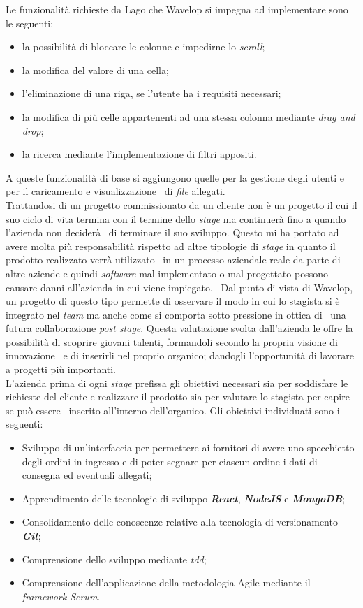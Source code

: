 Le funzionalità richieste da Lago che Wavelop si impegna ad implementare sono le seguenti: \
\begin{itemize}
  \item la possibilità di bloccare le colonne e impedirne lo \emph{scroll};
  \item la modifica del valore di una cella;
  \item l'eliminazione di una riga, se l'utente ha i requisiti necessari;
  \item la modifica di più celle appartenenti ad una stessa colonna mediante \emph{drag and drop};
  \item la ricerca mediante l'implementazione di filtri appositi.
\end{itemize}
A queste funzionalità di base si aggiungono quelle per la gestione degli utenti e per il caricamento e visualizzazione \
di \emph{file} allegati. \\

Trattandosi di un progetto commissionato da un cliente non è un progetto il cui il suo ciclo di vita termina con il termine dello \emph{stage} ma continuerà fino a quando l'azienda non deciderà \
di terminare il suo sviluppo. Questo mi ha portato ad avere molta più responsabilità rispetto ad altre tipologie di \emph{stage} in quanto il prodotto realizzato verrà utilizzato \
in un processo aziendale reale da parte di altre aziende e quindi \emph{software} mal implementato o mal progettato possono causare danni all'azienda in cui viene impiegato. \
Dal punto di vista di Wavelop, un progetto di questo tipo permette di osservare il modo in cui lo stagista si è integrato nel \emph{team} ma anche come si comporta sotto pressione in ottica di \
una futura collaborazione \emph{post stage}. Questa valutazione svolta dall'azienda le offre la possibilità di scoprire giovani talenti, formandoli secondo la propria visione di innovazione \
e di inserirli nel proprio organico; dandogli l'opportunità di lavorare a progetti più importanti. \\

L'azienda prima di ogni \emph{stage} prefissa gli obiettivi necessari sia per soddisfare le richieste del cliente e realizzare il prodotto sia per valutare lo stagista per capire se può essere \
inserito all'interno dell'organico. Gli obiettivi individuati sono i seguenti:
\begin{itemize}
  \item Sviluppo di un'interfaccia per permettere ai fornitori di avere uno specchietto degli ordini in ingresso e di poter segnare per ciascun ordine i dati di consegna ed eventuali allegati;
  \item Apprendimento delle tecnologie di sviluppo \emph{\textbf{React}}, \emph{\textbf{NodeJS}} e \emph{\textbf{MongoDB}};
  \item Consolidamento delle conoscenze relative alla tecnologia di versionamento \emph{\textbf{Git}};
  \item Comprensione dello sviluppo mediante \emph{\acrshort{tdd}};
  \item Comprensione dell'applicazione della metodologia Agile mediante il \emph{framework Scrum}.
\end{itemize}

